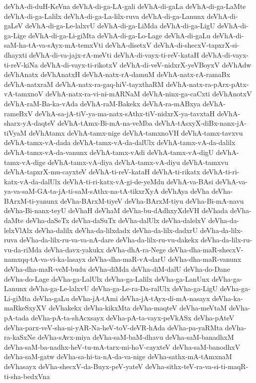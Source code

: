 {deVhA-di-duH-KeVna
deVhA-di-ga-LA-gali
deVhA-di-gaLa
deVhA-di-ga-LaMte
deVhA-di-ga-Lalilx
deVhA-di-ga-La-lilx-ruva
deVhA-di-ga-Lanunx
deVhA-di-gaLeV
deVhA-di-ga-Le-lalxvU
deVhA-di-ga-LiMda
deVhA-di-ga-LigU
deVhA-di-ga-Lige
deVhA-di-ga-Li-giMta
deVhA-di-ga-Lo-Lage
deVhA-di-gaLu
deVhA-di-saM-ha-tA-va-sAyx-mA-temxVti
deVhA-disetxV
deVhA-di-shecxV-tapxrX-si-dhayxti
deVhA-di-va-jajx-rA-meVti
deVhA-di-vayx-ti-reV-kataH
deVhA-di-vayx-ti-reV-kiNa
deVhA-di-vayx-ti-rikotxV
deVhA-di-veV-nidxrX-yeVBoyxV
deVhAdw
deVhAnatx
deVhAnatxH
deVhA-natx-rA-damuM
deVhA-natx-rA-ramaBx
deVhA-natxraM
deVhA-natx-ra-gaq-hiV-tayxthaRM
deVhA-natx-ra-pArx-pAtx-vA-tamxnoV
deVhA-natx-ra-vi-ni-mARNaM
deVhA-ninx-ga-caCxti
deVhAnotxV
deVhA-raM-Ba-ka-vAda
deVhA-raM-Bakekx
deVhA-ra-mABxya
deVhA-rameBxV
deVhA-sa-jA-tiV-ya-ma-natx-sAthx-tiV-nidxrX-ya-tavxtaH
deVhA-sharx-yA-daqteV
deVhA-tAmx-Bi-mA-na-veMba
deVhA-tAsxyX-diBx-nanx-jA-tiVyaM
deVhAtamx
deVhA-tamx-nige
deVhA-tamxnoVH
deVhA-tamx-tavxvu
deVhA-tamx-vA-dada
deVhA-tamx-vA-da-dalUlx
deVhA-tamx-vA-da-dalilx
deVhA-tamx-vA-da-vanunx
deVhA-tamx-vAdi
deVhA-tamx-vA-digU
deVhA-tamx-vA-dige
deVhA-tamx-vA-diya
deVhA-tamx-vA-diyu
deVhA-tamxvu
deVhA-tapxrX-mu-cayxteV
deVhA-ti-reV-kataH
deVhA-ti-rikatx
deVhA-ti-ri-katx-vA-da-dalUlx
deVhA-ti-ri-katx-vA-gi-de-yeMdu
deVhA-va-BAsi
deVhA-va-ya-va-saM-GA-ta-jA-ti-saM-sAthx-na-tA-tikxrXyA
deVhAya
deVha
deVha-BArxM-ti-yanunx
deVha-BArxM-tiyeV
deVha-BArxM-tiyu
deVha-Bi-mA-navu
deVha-Bi-nanx-teyU
deVhaH
deVhaM
deVha-bu-dAdhxyXdeVH
deVhada
deVha-daMte
deVha-daSeTx
deVha-daSuTx
deVha-dalUlx
deVha-dalelxV
deVha-da-lelxVlAlx
deVha-dalilx
deVha-da-lilxdadx
deVha-da-lilx-dadxrU
deVha-da-lilx-ruva
deVha-da-lilx-ru-va-va-nA-dare
deVha-da-lilx-ru-vu-dakekx
deVha-da-lilx-ru-vu-da-riMda
deVha-davx-yakukx
deVha-dhA-ra-Nege
deVha-dha-maR-shecxV-namxqq-tA-va-vi-ka-lasayx
deVha-dha-maR-vA-darU
deVha-dha-maR-vanunx
deVha-dha-maR-veM-budu
deVha-diMda
deVha-diM-dalU
deVha-do-Dane
deVha-do-Lage
deVha-ga-LalUlx
deVha-ga-Lalilx
deVha-ga-LanUnx
deVha-ga-Lanunx
deVha-ga-Le-lalxvU
deVha-ga-Le-ra-Da-ralUlx
deVha-ga-LigU
deVha-ga-Li-giMta
deVha-gaLu
deVha-jA-tAmi
deVha-jA-tAyx-di-mA-nasayx
deVha-ka-maRkeSxyXV
deVhakekx
deVha-kikxMta
deVha-maqteV
deVha-meVtaM
deVha-pA-tada
deVha-pA-ta-shAcxsayx
deVha-pA-ta-vayx-peVkASx
deVha-pAteV
deVha-parx-veV-sha-ni-yAR-Na-heV-toV-deVR-hAda
deVha-pa-yaRMta
deVha-ra-kaSxNe
deVha-sAvx-miya
deVha-saM-baM-dhavu
deVha-saM-banadhxM
deVha-saM-ba-nadhx-heV-tu-mA-tarx-mi-hoV-cayxteV
deVha-saM-banodhxV
deVha-saM-gatw
deVha-sa-hi-ta-nA-da-va-nige
deVha-sathx-mA-tAmxnaM
deVhasayx
deVha-shecxV-da-Buyx-peV-yateV
deVha-sithx-teV-ra-va-si-ti-maqR-ti-sha-bedxVna
}
